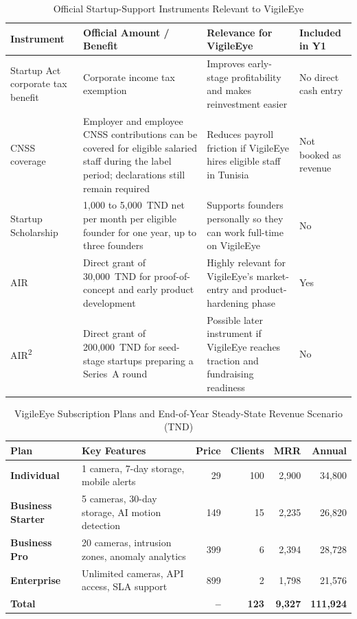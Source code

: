 \documentclass[12pt,a4paper,oneside]{report}
\begin{document}
\begin{table}[!htbp]
\centering
\small
\begin{tabular}{|p{3.6cm}|p{3.6cm}|p{4.1cm}|p{1.6cm}|}
\hline
\rowcolor{gray!20}
\textbf{Instrument} & \textbf{Official Amount / Benefit} & \textbf{Relevance for VigileEye} & \textbf{Included in Y1} \\
\hline
Startup Act corporate tax benefit & Corporate income tax exemption & Improves early-stage profitability and makes reinvestment easier & No direct cash entry \\
\hline
CNSS coverage & Employer and employee CNSS contributions can be covered for eligible salaried staff during the label period; declarations still remain required & Reduces payroll friction if VigileEye hires eligible staff in Tunisia & Not booked as revenue \\
\hline
Startup Scholarship & 1{,}000 to 5{,}000~TND net per month per eligible founder for one year, up to three founders & Supports founders personally so they can work full-time on VigileEye & No \\
\hline
AIR & Direct grant of 30{,}000~TND for proof-of-concept and early product development & Highly relevant for VigileEye's market-entry and product-hardening phase & Yes \\
\hline
AIR\textsuperscript{2} & Direct grant of 200{,}000~TND for seed-stage startups preparing a Series~A round & Possible later instrument if VigileEye reaches traction and fundraising readiness & No \\
\hline
\end{tabular}
\caption{Official Startup-Support Instruments Relevant to VigileEye}
\label{tab:vigileeye_startup_support_appendix}
\end{table}

\begin{table}[!htbp]
\centering
\small
\begin{tabular}{|>{\bfseries}p{2.6cm}|p{4.2cm}|r|r|r|r|}
\hline
\rowcolor{gray!20}
\textbf{Plan} & \textbf{Key Features} & \textbf{Price} & \textbf{Clients} & \textbf{MRR} & \textbf{Annual} \\
\hline
Individual & 1 camera, 7-day storage, mobile alerts & 29 & 100 & 2{,}900 & 34{,}800 \\
\hline
Business Starter & 5 cameras, 30-day storage, AI motion detection & 149 & 15 & 2{,}235 & 26{,}820 \\
\hline
Business Pro & 20 cameras, intrusion zones, anomaly analytics & 399 & 6 & 2{,}394 & 28{,}728 \\
\hline
Enterprise & Unlimited cameras, API access, SLA support & 899 & 2 & 1{,}798 & 21{,}576 \\
\hline
\rowcolor{gray!20}
\textbf{Total} &  & \textbf{--} & \textbf{123} & \textbf{9{,}327} & \textbf{111{,}924} \\
\hline
\end{tabular}
\caption{VigileEye Subscription Plans and End-of-Year Steady-State Revenue Scenario (TND)}
\label{tab:vigileeye_pricing_appendix}
\end{table}
\end{document}
